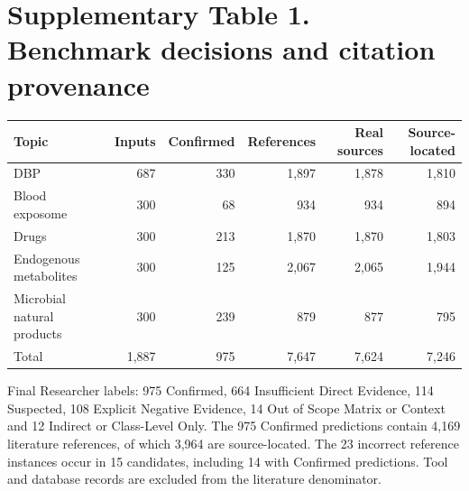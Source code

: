 \documentclass[10pt]{article}
\begin{document}
\section*{Supplementary Table 1. Benchmark decisions and citation provenance}
\begin{center}\small
\begin{tabular}{lrrrrr}\toprule
Topic & Inputs & Confirmed & References & Real sources & Source-located\\\midrule
DBP & 687 & 330 & 1,897 & 1,878 & 1,810\\
Blood exposome & 300 & 68 & 934 & 934 & 894\\
Drugs & 300 & 213 & 1,870 & 1,870 & 1,803\\
Endogenous metabolites & 300 & 125 & 2,067 & 2,065 & 1,944\\
Microbial natural products & 300 & 239 & 879 & 877 & 795\\
\midrule
Total & 1,887 & 975 & 7,647 & 7,624 & 7,246\\\bottomrule
\end{tabular}\end{center}
Final Researcher labels: 975 Confirmed, 664 Insufficient Direct Evidence, 114 Suspected, 108 Explicit Negative Evidence, 14 Out of Scope Matrix or Context and 12 Indirect or Class-Level Only. The 975 Confirmed predictions contain 4,169 literature references, of which 3,964 are source-located. The 23 incorrect reference instances occur in 15 candidates, including 14 with Confirmed predictions. Tool and database records are excluded from the literature denominator.
\end{document}

